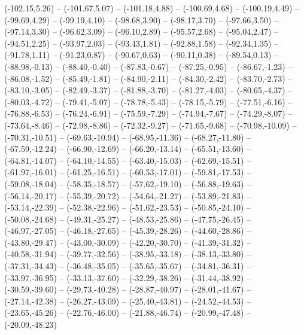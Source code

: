 {  (-102.15,5.26) -- (-101.67,5.07) -- (-101.18,4.88) -- (-100.69,4.68) -- (-100.19,4.49) -- (-99.69,4.29) -- (-99.19,4.10) --
  (-98.68,3.90) -- (-98.17,3.70) -- (-97.66,3.50) -- (-97.14,3.30) -- (-96.62,3.09) -- (-96.10,2.89) -- (-95.57,2.68) --
  (-95.04,2.47) -- (-94.51,2.25) -- (-93.97,2.03) -- (-93.43,1.81) -- (-92.88,1.58) -- (-92.34,1.35) -- (-91.78,1.11) --
  (-91.23,0.87) -- (-90.67,0.63) -- (-90.11,0.38) -- (-89.54,0.13) -- (-88.98,-0.13) -- (-88.40,-0.40) -- (-87.83,-0.67) --
  (-87.25,-0.95) -- (-86.67,-1.23) -- (-86.08,-1.52) -- (-85.49,-1.81) -- (-84.90,-2.11) -- (-84.30,-2.42) -- (-83.70,-2.73) --
  (-83.10,-3.05) -- (-82.49,-3.37) -- (-81.88,-3.70) -- (-81.27,-4.03) -- (-80.65,-4.37) -- (-80.03,-4.72) -- (-79.41,-5.07) --
  (-78.78,-5.43) -- (-78.15,-5.79) -- (-77.51,-6.16) -- (-76.88,-6.53) -- (-76.24,-6.91) -- (-75.59,-7.29) -- (-74.94,-7.67) --
  (-74.29,-8.07) -- (-73.64,-8.46) -- (-72.98,-8.86) -- (-72.32,-9.27) -- (-71.65,-9.68) -- (-70.98,-10.09) -- (-70.31,-10.51) --
  (-69.63,-10.94) -- (-68.95,-11.36) -- (-68.27,-11.80) -- (-67.59,-12.24) -- (-66.90,-12.69) -- (-66.20,-13.14) -- (-65.51,-13.60) --
  (-64.81,-14.07) -- (-64.10,-14.55) -- (-63.40,-15.03) -- (-62.69,-15.51) -- (-61.97,-16.01) -- (-61.25,-16.51) -- (-60.53,-17.01) --
  (-59.81,-17.53) -- (-59.08,-18.04) -- (-58.35,-18.57) -- (-57.62,-19.10) -- (-56.88,-19.63) -- (-56.14,-20.17) -- (-55.39,-20.72) --
  (-54.64,-21.27) -- (-53.89,-21.83) -- (-53.14,-22.39) -- (-52.38,-22.96) -- (-51.62,-23.53) -- (-50.85,-24.10) -- (-50.08,-24.68) --
  (-49.31,-25.27) -- (-48.53,-25.86) -- (-47.75,-26.45) -- (-46.97,-27.05) -- (-46.18,-27.65) -- (-45.39,-28.26) -- (-44.60,-28.86) --
  (-43.80,-29.47) -- (-43.00,-30.09) -- (-42.20,-30.70) -- (-41.39,-31.32) -- (-40.58,-31.94) -- (-39.77,-32.56) -- (-38.95,-33.18) --
  (-38.13,-33.80) -- (-37.31,-34.43) -- (-36.48,-35.05) -- (-35.65,-35.67) -- (-34.81,-36.31) -- (-33.97,-36.95) -- (-33.13,-37.60) --
  (-32.29,-38.26) -- (-31.44,-38.92) -- (-30.59,-39.60) -- (-29.73,-40.28) -- (-28.87,-40.97) -- (-28.01,-41.67) -- (-27.14,-42.38) --
  (-26.27,-43.09) -- (-25.40,-43.81) -- (-24.52,-44.53) -- (-23.65,-45.26) -- (-22.76,-46.00) -- (-21.88,-46.74) -- (-20.99,-47.48) --
  (-20.09,-48.23)}
